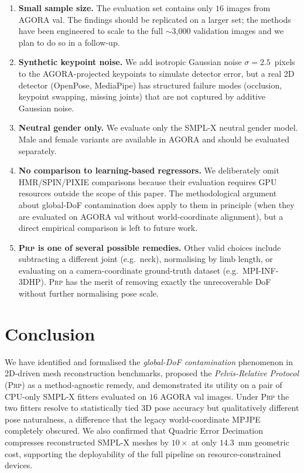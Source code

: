 \documentclass[twocolumn,10pt]{svjour3}
\newcommand{\prp}{\textsc{Prp}}
\begin{document}
\begin{enumerate}
  \item \textbf{Small sample size.} The evaluation set contains only $16$ images from AGORA val. The findings should be replicated on a larger set; the methods have been engineered to scale to the full $\sim$3{,}000 validation images and we plan to do so in a follow-up.
  \item \textbf{Synthetic keypoint noise.} We add isotropic Gaussian noise $\sigma=2.5$~pixels to the AGORA-projected keypoints to simulate detector error, but a real 2D detector (OpenPose, MediaPipe) has structured failure modes (occlusion, keypoint swapping, missing joints) that are not captured by additive Gaussian noise.
  \item \textbf{Neutral gender only.} We evaluate only the SMPL-X neutral gender model. Male and female variants are available in AGORA and should be evaluated separately.
  \item \textbf{No comparison to learning-based regressors.} We deliberately omit HMR/SPIN/PIXIE comparisons because their evaluation requires GPU resources outside the scope of this paper. The methodological argument about global-DoF contamination does apply to them in principle (when they are evaluated on AGORA val without world-coordinate alignment), but a direct empirical comparison is left to future work.
  \item \textbf{\prp{} is one of several possible remedies.} Other valid choices include subtracting a different joint (e.g.\ neck), normalising by limb length, or evaluating on a camera-coordinate ground-truth dataset (e.g.\ MPI-INF-3DHP). \prp{} has the merit of removing exactly the unrecoverable DoF without further normalising pose scale.
\end{enumerate}

\section{Conclusion}
\label{sec:conclusion}

We have identified and formalised the \emph{global-DoF contamination} phenomenon in 2D-driven mesh reconstruction benchmarks, proposed the \emph{Pelvis-Relative Protocol} (\prp{}) as a method-agnostic remedy, and demonstrated its utility on a pair of CPU-only SMPL-X fitters evaluated on $16$ AGORA val images. Under \prp{} the two fitters resolve to statistically tied 3D pose accuracy but qualitatively different pose naturalness, a difference that the legacy world-coordinate MPJPE completely obscured. We also confirmed that Quadric Error Decimation compresses reconstructed SMPL-X meshes by $10\times$ at only $14.3$~mm geometric cost, supporting the deployability of the full pipeline on resource-constrained devices.
\end{document}
